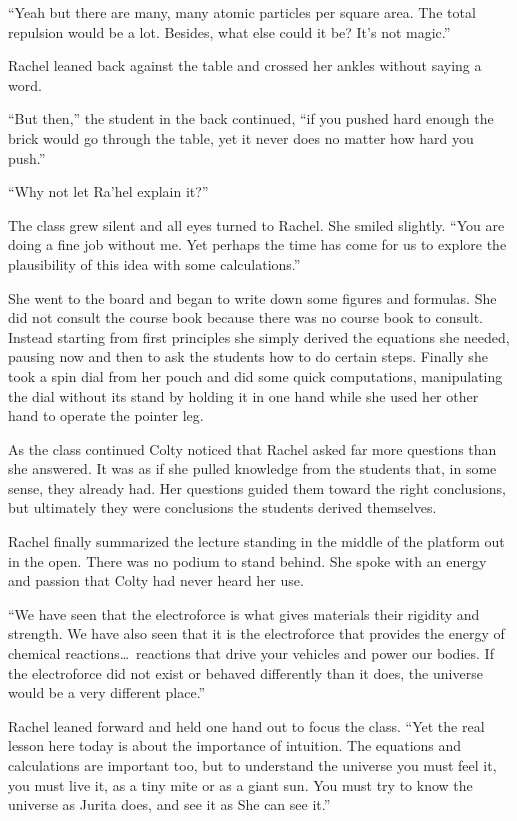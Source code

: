``Yeah but there are many, many atomic particles per square area. The total repulsion would be
a lot. Besides, what else could it be? It's not magic.''

Rachel leaned back against the table and crossed her ankles without saying a word.

``But then,'' the student in the back continued, ``if you pushed hard enough the brick would go
through the table, yet it never does no matter how hard you push.''

``Why not let Ra'hel explain it?''

The class grew silent and all eyes turned to Rachel. She smiled slightly. ``You are doing a fine
job without me. Yet perhaps the time has come for us to explore the plausibility of this idea
with some calculations.''

She went to the board and began to write down some figures and formulas. She did not consult the
course book because there was no course book to consult. Instead starting from first principles
she simply derived the equations she needed, pausing now and then to ask the students how to do
certain steps. Finally she took a spin dial from her pouch and did some quick computations,
manipulating the dial without its stand by holding it in one hand while she used her other hand
to operate the pointer leg.

As the class continued Colty noticed that Rachel asked far more questions than she answered. It
was as if she pulled knowledge from the students that, in some sense, they already had. Her
questions guided them toward the right conclusions, but ultimately they were conclusions the
students derived themselves.

Rachel finally summarized the lecture standing in the middle of the platform out in the open.
There was no podium to stand behind. She spoke with an energy and passion that Colty had never
heard her use.

``We have seen that the electroforce is what gives materials their rigidity and strength. We
have also seen that it is the electroforce that provides the energy of chemical reactions\ldots\
reactions that drive your vehicles and power our bodies. If the electroforce did not exist or
behaved differently than it does, the universe would be a very different place.''

Rachel leaned forward and held one hand out to focus the class. ``Yet the real lesson here today
is about the importance of intuition. The equations and calculations are important too, but to
understand the universe you must feel it, you must live it, as a tiny mite or as a giant sun.
You must try to know the universe as Jurita does, and see it as She can see it.''

